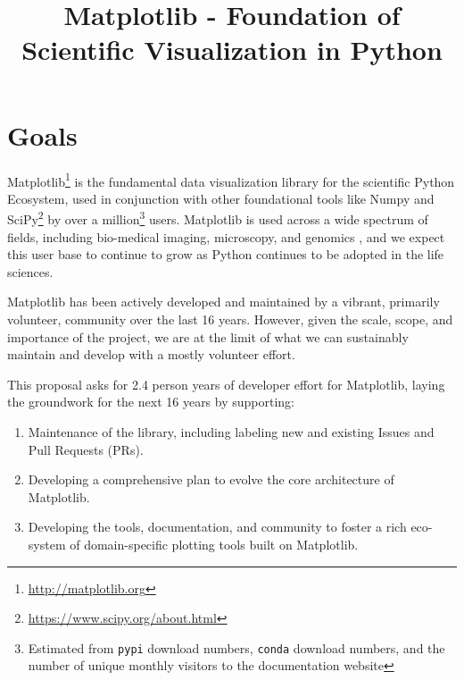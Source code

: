 \documentclass[11pt,letterpaper]{article}  %
\begin{document}
\title{Matplotlib - Foundation of Scientific Visualization in Python}
\author{}
\maketitle

\section{Goals}

Matplotlib\footnote{\url{http://matplotlib.org}} is the fundamental
data visualization library for the scientific Python Ecosystem, used
in conjunction with other foundational tools like Numpy and
SciPy\footnote{\url{https://www.scipy.org/about.html}} by over a
million\footnote{Estimated from \texttt{pypi} download numbers,
\texttt{conda} download numbers, and the number of unique monthly
visitors to the documentation website} users.  Matplotlib is used
across a wide spectrum of fields, including bio-medical imaging,
microscopy, and genomics
\cite{Carpenter2006,Wolf2018,10.7717/peerj.453,
  Segata2011,10.1371/journal.pgen.1000695,HASHIMSHONY2012666,
  10.1093/bioinformatics/bts480,Carlile2014,Laganowsky2014,Jiangaac9462,
  10.3389/fninf.2014.00014}, and we expect this user base to continue
to grow as Python continues to be adopted in the life sciences.

Matplotlib has been actively developed and maintained by a vibrant,
primarily volunteer, community over the last 16 years.  However, given
the scale, scope, and importance of the project, we are at the limit
of what we can sustainably maintain and develop with a mostly
volunteer effort.

This proposal asks for 2.4 person years of developer effort for
Matplotlib, laying the groundwork for the next 16 years by supporting:

\begin{enumerate}[label=\alph*),noitemsep]
  \item Maintenance of the library, including labeling new and
    existing Issues and Pull Requests (PRs).
  \item Developing a comprehensive plan to evolve the core architecture
    of Matplotlib.
  \item Developing the tools, documentation, and community to foster a
    rich eco-system of domain-specific plotting tools built on
    Matplotlib.
\end{enumerate}


\end{document}
